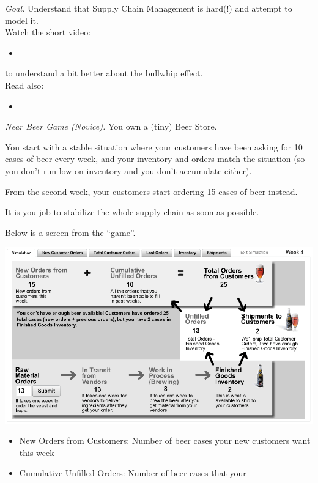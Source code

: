\emph{Goal. } Understand that Supply Chain Management is hard(!) and attempt to model it. \\


Watch the short video:
\begin{itemize}
	\item {}
\end{itemize}
to understand a bit better about the bullwhip effect. \\


Read also:
\begin{itemize}
	\item {}
\end{itemize}






\vfill
\emph{Near Beer Game (Novice). } You own a (tiny) Beer Store.

You start with a stable situation where your customers have been asking for 10 cases of beer every week, and your inventory and orders match the situation (so you don't run low on inventory and you don't accumulate either).

From the second week, your customers start ordering 15 cases of beer instead.

It is you job to stabilize the whole supply chain as soon as possible.

Below is a screen from the ``game''.
\begin{center}
\includegraphics*[width=400pt]{images/project-bullwhip-Near_Beer_Game.png}
\end{center}

\begin{itemize}
\item New Orders from Customers: Number of beer cases your new customers want this week
\item Cumulative Unfilled Orders: Number of beer cases that your 
\end{itemize}




